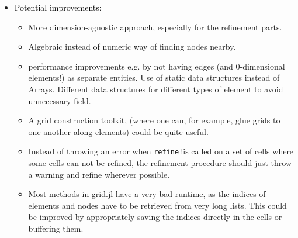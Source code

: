 \documentclass{article}
\begin{document}
\begin{itemize}
\item \textcolor{black}{Potential improvements:}
    \begin{itemize}
        \item More dimension-agnostic approach, especially for the refinement parts.
        \item Algebraic instead of numeric way of finding nodes nearby.
        \item performance improvements e.g. by not having edges (and 0-dimensional elements!) as separate entities. Use of static data structures instead of Arrays. Different data structures for different types of element to avoid unnecessary field. 
        \item A grid construction toolkit, (where one can, for example, glue grids to one another along elements) could be quite useful.
        \item Instead of throwing an error when \texttt{refine!}is called on a set of cells where some cells can not be refined, the refinement procedure should just throw a warning and refine wherever possible.
        \item Most methods in grid.jl have a very bad runtime, as the indices of elements and nodes have to be retrieved from very long lists. This could be improved by appropriately saving the indices directly in the cells or buffering them.
    \end{itemize}



\end{itemize}
\end{document}

